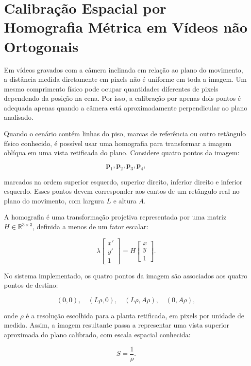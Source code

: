 \section{Calibração Espacial por Homografia Métrica em Vídeos não Ortogonais}

Em vídeos gravados com a câmera inclinada em relação ao plano do movimento, a distância medida diretamente em pixels não é uniforme em toda a imagem. Um mesmo comprimento físico pode ocupar quantidades diferentes de pixels dependendo da posição na cena. Por isso, a calibração por apenas dois pontos é adequada apenas quando a câmera está aproximadamente perpendicular ao plano analisado.

Quando o cenário contém linhas do piso, marcas de referência ou outro retângulo físico conhecido, é possível usar uma homografia para transformar a imagem oblíqua em uma vista retificada do plano. Considere quatro pontos da imagem:

\[
    \mathbf{p}_1,\mathbf{p}_2,\mathbf{p}_3,\mathbf{p}_4,
\]

marcados na ordem superior esquerdo, superior direito, inferior direito e inferior esquerdo. Esses pontos devem corresponder aos cantos de um retângulo real no plano do movimento, com largura $L$ e altura $A$.

A homografia é uma transformação projetiva representada por uma matriz $H \in \mathbb{R}^{3\times3}$, definida a menos de um fator escalar:

\[
    \lambda
    \begin{bmatrix}
    x'\\y'\\1
    \end{bmatrix}
    =
    H
    \begin{bmatrix}
    x\\y\\1
    \end{bmatrix}.
\]

No sistema implementado, os quatro pontos da imagem são associados aos quatro pontos de destino:

\[
    (0,0),\quad
    (L\rho,0),\quad
    (L\rho,A\rho),\quad
    (0,A\rho),
\]

onde $\rho$ é a resolução escolhida para a planta retificada, em pixels por unidade de medida. Assim, a imagem resultante passa a representar uma vista superior aproximada do plano calibrado, com escala espacial conhecida:

\[
    S = \frac{1}{\rho}.
\]

